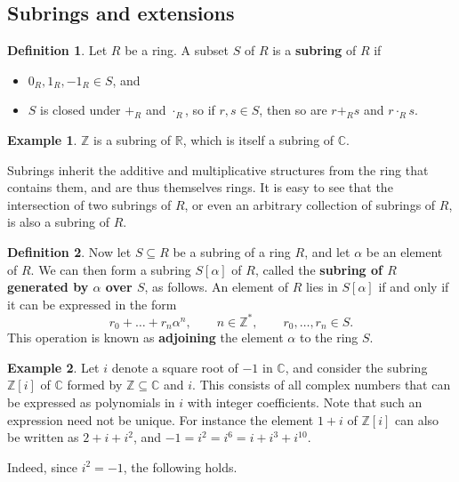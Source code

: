 \documentclass{article}
\newcommand{\Z}{\mathbb{Z}}
\newcommand{\R}{\mathbb{R}}
\newcommand{\C}{\mathbb{C}}
\renewcommand{\sb}[1]{\left[ #1 \right]}
\theoremstyle{definition}\newtheorem{definition}{Definition}[subsection]
\theoremstyle{definition}\newtheorem{remark}[definition]{Remark}
\theoremstyle{definition}\newtheorem*{example}{Example}
\theoremstyle{definition}\newtheorem*{note}{Note}
\begin{document}
\subsection{Subrings and extensions}

\begin{definition}
Let $ R $ be a ring. A subset $ S $ of $ R $ is a \textbf{subring} of $ R $ if
\begin{itemize}
\item $ 0_R, 1_R, -1_R \in S $, and
\item $ S $ is closed under $ +_R $ and $ \cdot_R $, so if $ r, s \in S $, then so are $ r +_R s $ and $ r \cdot_R s $.
\end{itemize}
\end{definition}

\begin{example}
$ \Z $ is a subring of $ \R $, which is itself a subring of $ \C $.
\end{example}

Subrings inherit the additive and multiplicative structures from the ring that contains them, and are thus themselves rings. It is easy to see that the intersection of two subrings of $ R $, or even an arbitrary collection of subrings of $ R $, is also a subring of $ R $.

\begin{definition}
Now let $ S \subseteq R $ be a subring of a ring $ R $, and let $ \alpha $ be an element of $ R $. We can then form a subring $ S\sb{\alpha} $ of $ R $, called the \textbf{subring of $ R $ generated by $ \alpha $ over $ S $}, as follows. An element of $ R $ lies in $ S\sb{\alpha} $ if and only if it can be expressed in the form
$$ r_0 + \dots + r_n\alpha^n, \qquad n \in \Z^*, \qquad r_0, \dots, r_n \in S. $$
This operation is known as \textbf{adjoining} the element $ \alpha $ to the ring $ S $.
\end{definition}

\begin{example}
Let $ i $ denote a square root of $ -1 $ in $ \C $, and consider the subring $ \Z\sb{i} $ of $ \C $ formed by $ \Z \subseteq \C $ and $ i $. This consists of all complex numbers that can be expressed as polynomials in $ i $ with integer coefficients. Note that such an expression need not be unique. For instance the element $ 1 + i $ of $ \Z\sb{i} $ can also be written as $ 2 + i + i^2 $, and $ -1 = i^2 = i^6 = i + i^3 + i^{10} $.
\end{example}

Indeed, since $ i^2 = -1 $, the following holds.
\end{document}
